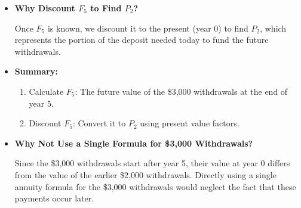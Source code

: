 \begin{example}
\begin{itemize}
            \item \textbf{Why Discount $F_5$ to Find $P_2$?} 
            
            Once $F_5$ is known, we discount it to the present (year 0) to find $P_2$, which represents the portion of the deposit needed today to fund the future withdrawals.
            
            \item \textbf{Summary:}
            
            \begin{enumerate}
                \item Calculate $F_5$: The future value of the \$3,000 withdrawals at the end of year 5.
                \item Discount $F_5$: Convert it to $P_2$ using present value factors.
            \end{enumerate}

            \item \textbf{Why Not Use a Single Formula for \$3,000 Withdrawals?}
    
            Since the \$3,000 withdrawals start after year 5, their value at year 0 differs from the value of the earlier \$2,000 withdrawals. Directly using a single annuity formula for the \$3,000 withdrawals would neglect the fact that these payments occur later. 
        \end{itemize}
    \end{example}
